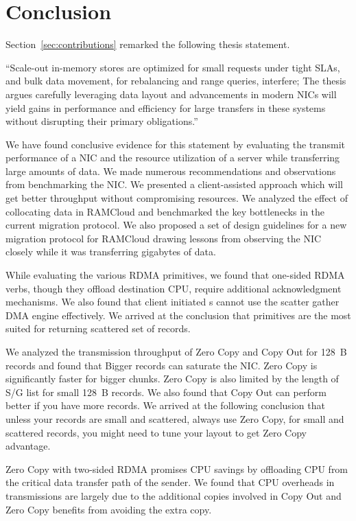 
\chapter{Conclusion}
\label{chap:conclusion}
Section~\ref{sec:contributions} remarked the following thesis statement.

``Scale-out in-memory stores are optimized for small requests
under tight SLAs, and bulk data movement, for rebalancing and range queries, interfere;
The thesis argues \linebreak carefully leveraging data layout and advancements in modern NICs
will yield gains in performance and efficiency for large transfers in these systems
without disrupting their primary obligations.''
 

We have found conclusive evidence for this statement by evaluating the transmit performance 
of a NIC and the resource utilization of a server while transferring large amounts of data. We 
made numerous recommendations and observations from benchmarking the NIC. We presented a client-assisted 
approach which will get better throughput without compromising resources. We analyzed the effect of collocating
data in RAMCloud and benchmarked the key bottlenecks in the current migration protocol. We also proposed a set of design 
guidelines for a new migration protocol for RAMCloud drawing lessons from observing the NIC closely while it was 
transferring gigabytes of data. 

While evaluating the various RDMA primitives, we found that one-sided RDMA verbs, though they offload destination CPU, 
require additional acknowledgment mechanisms. We also found that client initiated s cannot use the 
scatter gather DMA engine effectively. We arrived at the conclusion that  primitives 
are the most suited for returning scattered set of records.

We analyzed the transmission throughput of Zero Copy and Copy Out for 128~B records and found that Bigger records can saturate the NIC.
Zero Copy is significantly faster for bigger chunks. Zero Copy is also limited by the length of S/G list for small 128~B records.
We also found that Copy Out can perform better if you have more records. We arrived at the following conclusion that 
unless your records are small and scattered, always use Zero Copy, for small and scattered records, you might need to tune your layout 
to get Zero Copy advantage.

Zero Copy with two-sided RDMA promises CPU savings by offloading CPU from the critical data transfer path of the sender. We found that 
CPU overheads in transmissions are largely due to the additional copies involved in Copy Out and Zero Copy benefits from avoiding the extra copy.
 
